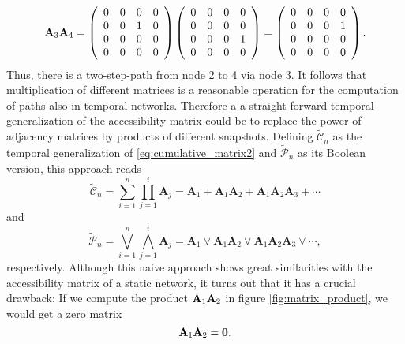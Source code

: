 \begin{equation}\label{eq:matrix_multi_example}
\mat{A}_3 \mat{A}_4=\left( \begin{array}{cccc}%
0 & 0 & 0 & 0 \\
 0 & 0 & 1 & 0 \\
0 & 0 & 0 & 0 \\
0 & 0 & 0 & 0 \end{array} \right)%
\left( \begin{array}{cccc}%
0 & 0 & 0 & 0 \\
 0 & 0 & 0 & 0 \\
0 & 0 & 0 & 1 \\
0 & 0 & 0 & 0 \end{array} \right)%
=%
\left( \begin{array}{cccc}%
0 & 0 & 0 & 0 \\
 0 & 0 & 0 & 1 \\
0 & 0 & 0 & 0 \\
0 & 0 & 0 & 0 \end{array} \right).%
\end{equation}
Thus, there is a two-step-path from node 2 to 4 via node 3.
It follows that multiplication of different matrices is a reasonable operation for the computation of paths also in temporal networks.
Therefore a a straight-forward temporal generalization of the accessibility matrix could be to replace the power of adjacency matrices by products of different snapshots.
Defining $\tilde{\mathcal{C}}_n$ as the temporal generalization of \eqref{eq:cumulative_matrix2} and $\tilde{\mathcal{P}}_n$ as its Boolean version, this approach reads
\begin{equation*}%
\tilde{\mathcal{C}}_n= \sum _{i=1} ^n \prod _{j=1} ^i \mathbf{A}_j = \mathbf{A}_1 + \mathbf{A}_1 \mathbf{A}_2 + \mathbf{A}_1 \mathbf{A}_2 \mathbf{A}_3 + \cdots
\end{equation*}
and
\begin{equation}\label{eq:wrong_access}
\tilde{\mathcal{P}}_n= \bigvee _{i=1} ^n \bigwedge _{j=1} ^i \mathbf{A}_j = \mathbf{A}_1 \vee \mathbf{A}_1 \mathbf{A}_2 \vee \mathbf{A}_1 \mathbf{A}_2 \mathbf{A}_3 \vee \cdots ,
\end{equation}
respectively.
Although this naive approach shows great similarities with the accessibility matrix of a static network, it turns out that it has a crucial drawback:
If we compute the product $\mathbf{A}_1 \mathbf{A}_2$ in figure \ref{fig:matrix_product}, we would get a zero matrix
\begin{equation}\label{eq:zero_matrix_product}
\mathbf{A}_1 \mathbf{A}_2 = \mathbf{0} .
\end{equation}
